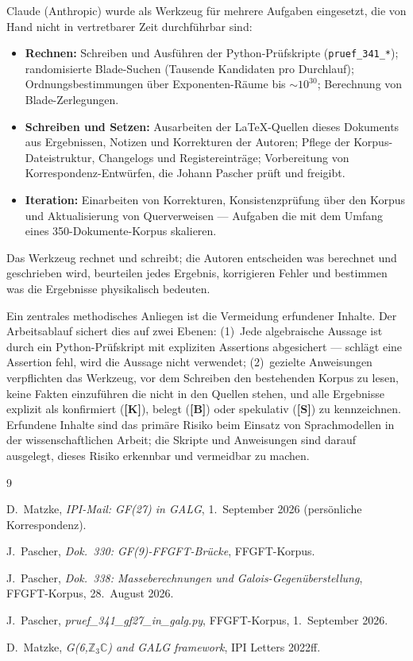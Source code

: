 Claude (Anthropic) wurde als Werkzeug für mehrere Aufgaben eingesetzt,
die von Hand nicht in vertretbarer Zeit durchführbar sind:
\begin{itemize}
  \item \textbf{Rechnen:} Schreiben und Ausführen der Python-Prüfskripte
    (\texttt{pruef\_341\_*}); randomisierte Blade-Suchen (Tausende Kandidaten
    pro Durchlauf); Ordnungsbestimmungen über Exponenten-Räume bis $\sim10^{30}$;
    Berechnung von Blade-Zerlegungen.
  \item \textbf{Schreiben und Setzen:} Ausarbeiten der \LaTeX-Quellen dieses
    Dokuments aus Ergebnissen, Notizen und Korrekturen der Autoren;
    Pflege der Korpus-Dateistruktur, Changelogs und Registereinträge;
    Vorbereitung von Korrespondenz-Entwürfen, die Johann Pascher prüft
    und freigibt.
  \item \textbf{Iteration:} Einarbeiten von Korrekturen, Konsistenzprüfung
    über den Korpus und Aktualisierung von Querverweisen --- Aufgaben die
    mit dem Umfang eines 350-Dokumente-Korpus skalieren.
\end{itemize}
Das Werkzeug rechnet und schreibt; die Autoren entscheiden was berechnet
und geschrieben wird, beurteilen jedes Ergebnis, korrigieren Fehler und
bestimmen was die Ergebnisse physikalisch bedeuten.

Ein zentrales methodisches Anliegen ist die Vermeidung erfundener Inhalte.
Der Arbeitsablauf sichert dies auf zwei Ebenen: (1)~Jede algebraische Aussage
ist durch ein Python-Prüfskript mit expliziten Assertions abgesichert ---
schlägt eine Assertion fehl, wird die Aussage nicht verwendet; (2)~gezielte
Anweisungen verpflichten das Werkzeug, vor dem Schreiben den bestehenden Korpus
zu lesen, keine Fakten einzuführen die nicht in den Quellen stehen, und alle
Ergebnisse explizit als konfirmiert (\textbf{[K]}), belegt (\textbf{[B]})
oder spekulativ (\textbf{[S]}) zu kennzeichnen. Erfundene Inhalte sind das
primäre Risiko beim Einsatz von Sprachmodellen in der wissenschaftlichen Arbeit;
die Skripte und Anweisungen sind darauf ausgelegt, dieses Risiko erkennbar
und vermeidbar zu machen.

\begin{thebibliography}{9}

D.~Matzke,
\textit{IPI-Mail: GF(27) in GALG},
1.~September 2026 (persönliche Korrespondenz).

J.~Pascher,
\textit{Dok.~330: GF(9)-FFGFT-Brücke},
FFGFT-Korpus.

J.~Pascher,
\textit{Dok.~338: Masseberechnungen und Galois-Gegenüberstellung},
FFGFT-Korpus, 28.~August 2026.

J.~Pascher,
\textit{pruef\_341\_gf27\_in\_galg.py},
FFGFT-Korpus, 1.~September 2026.

D.~Matzke,
\textit{G(6,$\mathbb{Z}_3\mathbb{C}$) and GALG framework},
IPI Letters 2022ff.

\end{thebibliography}
